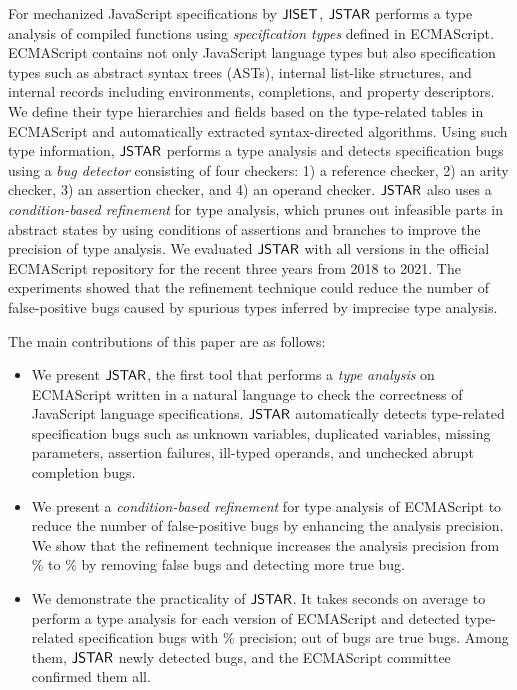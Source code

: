 For mechanized JavaScript specifications by $\jiset$, $\tool$ performs
a type analysis of compiled functions using \textit{specification types}
defined in ECMAScript. ECMAScript contains not only JavaScript
language types but also specification types such as abstract syntax
trees (ASTs), internal list-like structures, and internal records
including environments, completions, and property descriptors. We
define their type hierarchies and fields based on the type-related
tables in ECMAScript and automatically extracted syntax-directed algorithms.
Using such type information, $\tool$ performs a type analysis and detects specification bugs using
a \textit{bug detector} consisting of four checkers: 1) a reference
checker, 2) an arity checker, 3) an assertion checker, and 4) an operand checker.
$\tool$ also uses a \textit{condition-based refinement} for type
analysis, which prunes out infeasible parts in abstract states by using conditions
of assertions and branches to improve the precision of type analysis.
We evaluated $\tool$ with all  versions in the official
ECMAScript repository for the recent three years from 2018 to 2021.
The experiments showed that the refinement technique could reduce the number of
false-positive bugs caused by spurious types inferred by imprecise type analysis.

The main contributions of this paper are as follows:
\begin{itemize}
  \item We present $\tool$, the first tool that performs a \textit{type
    analysis} on ECMAScript written in a natural language to check the correctness of JavaScript language
    specifications.  $\tool$ automatically detects type-related specification
    bugs such as unknown variables, duplicated variables, missing
    parameters, assertion failures, ill-typed operands, and unchecked
    abrupt completion bugs.
  \item We present a \textit{condition-based refinement} for type analysis of
    ECMAScript to reduce the number of false-positive bugs by enhancing the analysis
    precision.  We show that the refinement technique increases the analysis
    precision from \% to \% by removing 
    false bugs and detecting  more true bug.
  \item We demonstrate the practicality of $\tool$. It takes 
    seconds on average to perform a type analysis for each version of ECMAScript and detected
     type-related specification bugs with \% precision;
     out of  bugs are true bugs.  Among them, $\tool$ 
    newly detected  bugs, and the ECMAScript committee confirmed them all.
\end{itemize}

